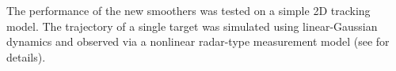 \documentclass[10pt,twocolumn,twoside]{IEEEtran}
\begin{document}
The performance of the new smoothers was tested on a simple 2D tracking model. The trajectory of a single target was simulated using linear-Gaussian dynamics and observed via a nonlinear radar-type measurement model (see \cite{Bar-Shalom2002} for details).
%
%
\end{document}

